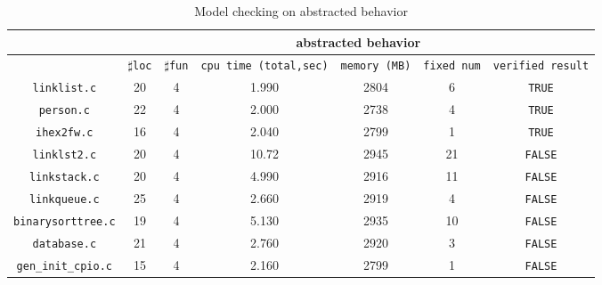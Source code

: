 \begin{table}
  \scriptsize
\begin{tabular}{|c|c|c|c|c|c|c|}
\hline
&\multicolumn{6}{|c|}{abstracted behavior} \\
\hline
 &$\sharp$\texttt{loc} & $\sharp$\texttt{fun} & \texttt{cpu time (total,sec)} & \texttt{memory (MB)} & \texttt{fixed num} & \texttt{verified result} \\
\hline
\texttt{linklist.c} &  20 & 4 & 1.990 & 2804 & 6 & \texttt{TRUE} \\
\hline
\texttt{person.c} & 22 & 4 & 2.000 & 2738 & 4 & \texttt{TRUE}  \\
\hline
\texttt{ihex2fw.c}  & 16 & 4 & 2.040 & 2799 & 1 & \texttt{TRUE} \\
\hline
\texttt{linklst2.c} & 20 & 4 & 10.72 & 2945 & 21 & \texttt{FALSE} \\
\hline
\texttt{linkstack.c} & 20 & 4 & 4.990 & 2916 & 11 & \texttt{FALSE} \\
\hline
\texttt{linkqueue.c} & 25 & 4 & 2.660 & 2919 & 4 & \texttt{FALSE} \\
\hline
\texttt{binarysorttree.c} & 19 & 4 & 5.130 & 2935 & 10 & \texttt{FALSE} \\
\hline
\texttt{database.c}  & 21 & 4 & 2.760 & 2920 & 3 & \texttt{FALSE} \\
\hline
\texttt{gen\_init\_cpio.c} & 15 & 4 & 2.160 & 2799 & 1 & \texttt{FALSE} \\
\hline
\end{tabular}
\caption{Model checking on abstracted behavior}
\label{tb:mca}
\end{table}


